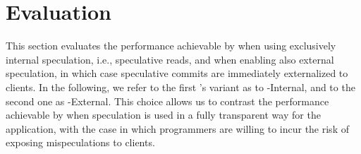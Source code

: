 
\section{Evaluation}
\label{sec:evaluation}
This section evaluates the %
 performance achievable by \specula when using exclusively internal speculation, i.e., speculative reads, and when enabling also external speculation, in which case speculative commits are immediately externalized to clients. In the following, we refer to the first \specula's variant as to  {\specula}-Internal, and to the second one as {\specula}-External. This choice allows us to contrast the performance achievable by \specula when speculation is used in a fully transparent way for the application, with the case in which programmers are willing to incur the risk of exposing mispeculations to clients.%

%
%

